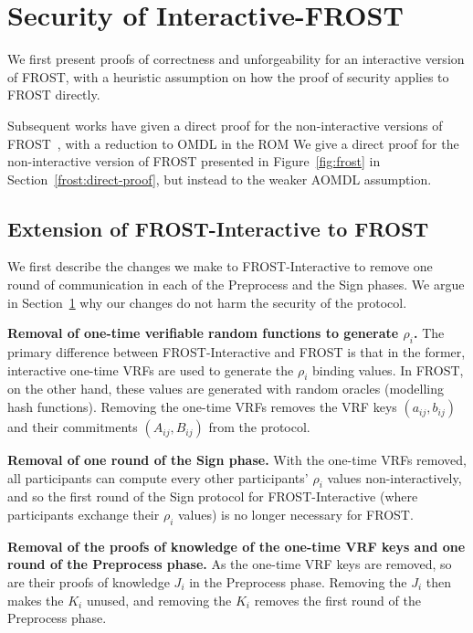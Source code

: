 \section{Security of Interactive-FROST}
\label{frost:interactive-proof}

We first present proofs of
correctness and unforgeability for an interactive version of FROST,
with a heuristic assumption on how the proof of security applies to FROST directly.

Subsequent works have given a direct proof for the
non-interactive versions of FROST~\cite{BellareCKMTZ22},
with a reduction to OMDL in the ROM
We give a direct proof for the non-interactive version of FROST presented in
Figure~\ref{fig:frost} in Section~\ref{frost:direct-proof},
but instead to the weaker AOMDL assumption.


\subsection{Extension of FROST-Interactive to FROST}
\label{interactive-to-frost}
We first describe the changes we make to FROST-Interactive
to remove one round of communication in each of the Preprocess and the Sign
phases.
We argue in Section~\ref{frost:interactive-proof} why our changes do not harm the
security of the protocol.

\textbf{Removal of one-time verifiable random functions to generate $\rho_i$.}
The primary difference between FROST-Interactive and FROST is that in the
former, interactive one-time VRFs are used to generate the $\rho_i$ binding
values.  In FROST, on the other hand, these values are generated with random
oracles (modelling hash functions).  Removing the one-time VRFs removes the VRF
keys $(a_{ij},b_{ij})$ and their commitments $(A_{ij}, B_{ij})$ from the
protocol.

\textbf{Removal of one round of the Sign phase.}
With the one-time VRFs removed, all participants can compute every other
participants' $\rho_i$ values non-interactively, and so the first round of the
Sign protocol for FROST-Interactive (where participants exchange their $\rho_i$
values) is no longer necessary for FROST.

\textbf{Removal of the proofs of knowledge of the one-time VRF keys and one round of the Preprocess phase.}
As the one-time VRF keys are removed, so are their proofs of knowledge $J_i$ in
the Preprocess phase.  Removing the $J_i$ then makes the $K_i$ unused, and
removing the $K_i$ removes the first round of the Preprocess phase.


